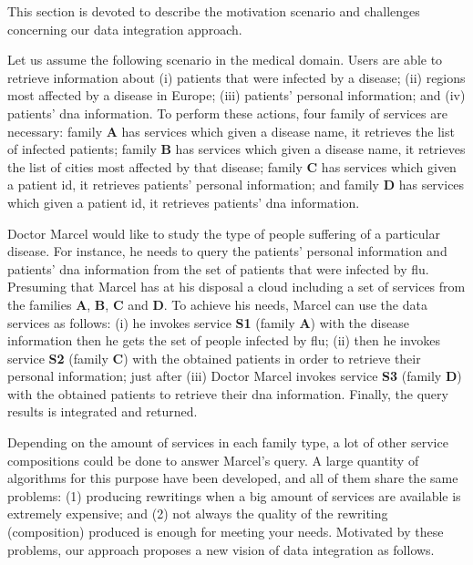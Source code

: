 This section is devoted to describe the motivation scenario and challenges
concerning our data integration approach.
%

Let us assume the following scenario in the medical domain. 
Users are able to retrieve information about (i) patients that were infected by a disease; 
(ii) regions most affected by a disease in Europe; 
(iii) patients' personal information; and 
(iv) patients' dna information.
To perform these actions, four family of services are necessary: family
\textbf{A} has services which given a disease name, it retrieves the list
of infected patients; family \textbf{B} has services which given a disease name,
it retrieves the list of cities most affected by that disease; family \textbf{C}
has services which given a patient id, it retrieves patients' personal
information; and family \textbf{D} has services which given a patient id, it
retrieves patients' dna information. 

Doctor Marcel would like to study the type of people suffering of a
particular disease. For instance, he needs to query the patients' personal
information and patients' dna information from the set of patients that were
infected by flu. Presuming that Marcel has at his disposal a cloud
including a set of services from the families \textbf{A}, \textbf{B}, \textbf{C} and \textbf{D}. To achieve
his needs, Marcel can use the data services as follows: (i) he invokes service
\textbf{S1} (family \textbf{A}) with the disease information then he gets the
set of people infected by flu; (ii) then he invokes service \textbf{S2} (family
\textbf{C}) with the obtained patients in order to retrieve their personal
information; just after (iii) Doctor Marcel invokes service \textbf{S3} (family
\textbf{D}) with the obtained patients to retrieve their dna information.
Finally, the query results is integrated and returned.

Depending on the amount of services in each family type, a lot of other service 
compositions could be done to answer Marcel's query. A large quantity of
algorithms for this purpose have been developed, and all of them share the same
problems: (1) producing rewritings when a big amount of services are available
is extremely expensive; and (2) not always the quality of the rewriting (composition) produced is enough for meeting your needs.
Motivated by these problems, our approach proposes a new vision of data
integration as follows.

